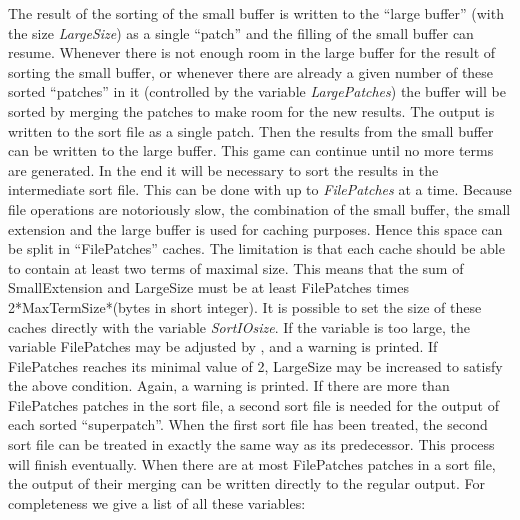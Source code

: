 The result of the sorting of the small buffer is written to the 
``large buffer'' (with the size {\sl 
LargeSize}) as a single ``patch'' and the filling of the 
small buffer can resume. Whenever there is not enough room in the large 
buffer for the result of sorting the small buffer, or whenever there are 
already a given number of these sorted ``patches'' in it (controlled by the 
variable {\sl LargePatches}) the buffer will be sorted 
by merging the patches to make room for the new results. The 
output is written to the sort file as a single patch. Then the results from 
the small buffer can be written to the large buffer. This game can continue 
until no more terms are generated. In the end it will be necessary to sort 
the results in the intermediate sort file. This can be 
done with up to {\sl FilePatches} at a time. Because 
file operations are notoriously slow, the combination of the small buffer, 
the small extension and the large buffer is used for caching 
purposes. Hence this space can be split in ``FilePatches'' caches. The 
limitation is that each cache should be able to contain at least two 
terms of maximal size. This means that the sum of SmallExtension and 
LargeSize must be at least FilePatches times 2*MaxTermSize*(bytes in short 
integer). It is possible to set the size of these caches directly with the 
variable {\sl SortIOsize}. If the variable is too large, 
the variable FilePatches may be adjusted by \FORM\@, and a warning is printed.
If FilePatches reaches its minimal value of 2, LargeSize may be increased
to satisfy the above condition. Again, a warning is printed.
If there are more than 
FilePatches patches in the sort file, a second sort file is needed for the 
output of each sorted ``superpatch''. When the first sort file has 
been treated, the second sort file can be treated in exactly the same way 
as its predecessor. This process will finish eventually. When there are at 
most FilePatches patches in a sort file, the output of their merging can be 
written directly to the regular output. For completeness we give a list of 
all these variables:



